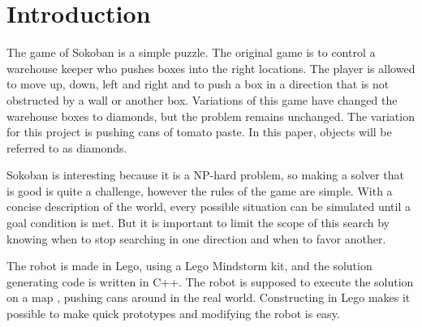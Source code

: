 \section{Introduction}


The game of Sokoban is a simple puzzle.
The original game is to control a warehouse keeper who pushes boxes into the right locations.
The player is allowed to move up, down, left and right and to push a box in a direction that is not obstructed by a wall or another box.
Variations of this game have changed the warehouse boxes to diamonds, but the problem remains unchanged.
The variation for this project is pushing cans of tomato paste.
In this paper, objects will be referred to as diamonds.

Sokoban is interesting because it is a NP-hard problem, so making a solver that is good is quite a challenge, however the rules of the game are simple.
With a concise description of the world, every possible situation can be simulated until a goal condition is met.
But it is important to limit the scope of this search by knowing when to stop searching in one direction and when to favor another.

The robot is made in Lego, using a Lego Mindstorm kit, and the solution generating code is written in C++. 
The robot is supposed to execute the solution on a map , pushing cans around in the real world.
Constructing in Lego makes it possible to make quick prototypes and modifying the robot is easy.
